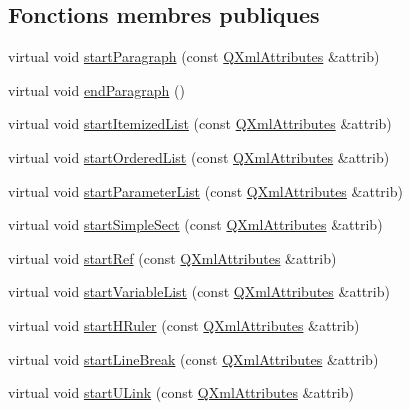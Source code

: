 \subsection*{Fonctions membres publiques}
\begin{DoxyCompactItemize}
\item 
virtual void \hyperlink{class_paragraph_handler_af56ab86b368c75d593b60c2f9f15ca3a}{start\+Paragraph} (const \hyperlink{class_q_xml_attributes}{Q\+Xml\+Attributes} \&attrib)
\item 
virtual void \hyperlink{class_paragraph_handler_ade8a39dec7a74310e5528756046be389}{end\+Paragraph} ()
\item 
virtual void \hyperlink{class_paragraph_handler_a18825f31985bed21fdfbb810f082ffd8}{start\+Itemized\+List} (const \hyperlink{class_q_xml_attributes}{Q\+Xml\+Attributes} \&attrib)
\item 
virtual void \hyperlink{class_paragraph_handler_a96cf596f30f5f8b636763e1ebe3ee64f}{start\+Ordered\+List} (const \hyperlink{class_q_xml_attributes}{Q\+Xml\+Attributes} \&attrib)
\item 
virtual void \hyperlink{class_paragraph_handler_a83f3a542b74242dc7e604976a3f97ab7}{start\+Parameter\+List} (const \hyperlink{class_q_xml_attributes}{Q\+Xml\+Attributes} \&attrib)
\item 
virtual void \hyperlink{class_paragraph_handler_a053036714297dbb2fe5b88f967bc9a57}{start\+Simple\+Sect} (const \hyperlink{class_q_xml_attributes}{Q\+Xml\+Attributes} \&attrib)
\item 
virtual void \hyperlink{class_paragraph_handler_a04f69561d94b04c0a6695c7babb28e51}{start\+Ref} (const \hyperlink{class_q_xml_attributes}{Q\+Xml\+Attributes} \&attrib)
\item 
virtual void \hyperlink{class_paragraph_handler_a1f2f984397377092a3e1a77a71d1dc73}{start\+Variable\+List} (const \hyperlink{class_q_xml_attributes}{Q\+Xml\+Attributes} \&attrib)
\item 
virtual void \hyperlink{class_paragraph_handler_a77c899c5290d9d3eef030da09ef27fe4}{start\+H\+Ruler} (const \hyperlink{class_q_xml_attributes}{Q\+Xml\+Attributes} \&attrib)
\item 
virtual void \hyperlink{class_paragraph_handler_ab20027a81543f080c559f171d1af8ca5}{start\+Line\+Break} (const \hyperlink{class_q_xml_attributes}{Q\+Xml\+Attributes} \&attrib)
\item 
virtual void \hyperlink{class_paragraph_handler_ab88b088c18e1654a066142209da5b8ea}{start\+U\+Link} (const \hyperlink{class_q_xml_attributes}{Q\+Xml\+Attributes} \&attrib)

\end{DoxyCompactItemize}
